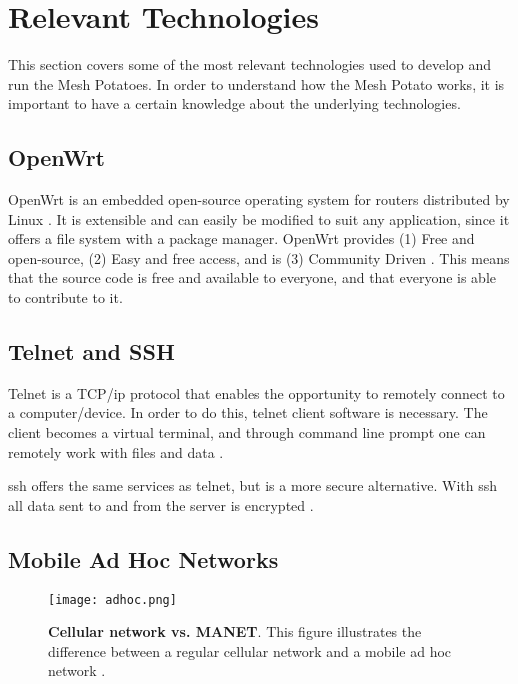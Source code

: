 \section{Relevant Technologies}
This section covers some of the most relevant technologies used to develop and run the Mesh Potatoes. In order to understand how the Mesh Potato works, it is important to have a certain knowledge about the underlying technologies. 

\subsection{OpenWrt}
\label{subsec:openwrt}
OpenWrt is an embedded open-source operating system for routers distributed by Linux \cite{openwrt}. It is extensible and can easily be modified to suit any application, since it offers a file system with a package manager. OpenWrt provides (1) Free and open-source, (2) Easy and free access, and is (3) Community Driven \cite{openwrt}. This means that the source code is free and available to everyone, and that everyone is able to contribute to it. 

\subsection{Telnet and SSH}

Telnet is a TCP/\gls{ip} protocol that enables the opportunity to remotely connect to a computer/device. In order to do this, telnet client software is necessary. The client becomes a virtual terminal, and through command line prompt one can remotely work with files and data \cite{telnet}. 

\gls{ssh} offers the same services as telnet, but is a more secure alternative. With \gls{ssh} all data sent to and from the server is encrypted \cite{SSH}. 


\subsection{Mobile Ad Hoc Networks}

\begin{figure}[b]
  \centering
    \texttt{[image: adhoc.png]}
     \caption [Cellular network vs. MANET]{\textbf{Cellular network vs. MANET}. This figure illustrates the difference between a regular cellular network and a mobile ad hoc network \cite{adhoc2}.}
\label{fig:adhoc}
\end{figure}

